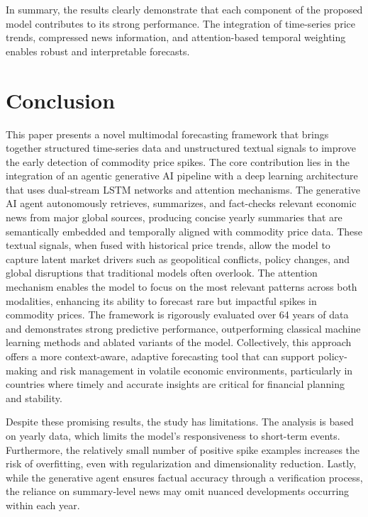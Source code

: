 \documentclass[12pt]{elsarticle}
\begin{document}
In summary, the results clearly demonstrate that each component of the proposed model contributes to its strong performance. The integration of time-series price trends, compressed news information, and attention-based temporal weighting enables robust and interpretable forecasts. 

\section{Conclusion}
\label{sec:conclusion}
This paper presents a novel multimodal forecasting framework that brings together structured time-series data and unstructured textual signals to improve the early detection of commodity price spikes. The core contribution lies in the integration of an agentic generative AI pipeline with a deep learning architecture that uses dual-stream LSTM networks and attention mechanisms. The generative AI agent autonomously retrieves, summarizes, and fact-checks relevant economic news from major global sources, producing concise yearly summaries that are semantically embedded and temporally aligned with commodity price data. These textual signals, when fused with historical price trends, allow the model to capture latent market drivers such as geopolitical conflicts, policy changes, and global disruptions that traditional models often overlook. The attention mechanism enables the model to focus on the most relevant patterns across both modalities, enhancing its ability to forecast rare but impactful spikes in commodity prices. The framework is rigorously evaluated over 64 years of data and demonstrates strong predictive performance, outperforming classical machine learning methods and ablated variants of the model. Collectively, this approach offers a more context-aware, adaptive forecasting tool that can support policy-making and risk management in volatile economic environments, particularly in countries where timely and accurate insights are critical for financial planning and stability.

Despite these promising results, the study has limitations. The analysis is based on yearly data, which limits the model’s responsiveness to short-term events. Furthermore, the relatively small number of positive spike examples increases the risk of overfitting, even with regularization and dimensionality reduction. Lastly, while the generative agent ensures factual accuracy through a verification process, the reliance on summary-level news may omit nuanced developments occurring within each year.
\end{document}
